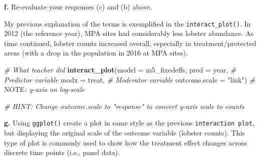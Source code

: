 \documentclass[
]{article}
\newenvironment{Shaded}{\begin{snugshade}}{\end{snugshade}}
\newcommand{\AlertTok}[1]{\textcolor[rgb]{0.94,0.16,0.16}{#1}}
\newcommand{\AttributeTok}[1]{\textcolor[rgb]{0.13,0.29,0.53}{#1}}
\newcommand{\CommentTok}[1]{\textcolor[rgb]{0.56,0.35,0.01}{\textit{#1}}}
\newcommand{\FunctionTok}[1]{\textcolor[rgb]{0.13,0.29,0.53}{\textbf{#1}}}
\newcommand{\NormalTok}[1]{#1}
\newcommand{\StringTok}[1]{\textcolor[rgb]{0.31,0.60,0.02}{#1}}
\begin{document}
\textbf{f.} Re-evaluate your responses (c) and (b) above.

My previous explanation of the terms is exemplified in the
\texttt{interact\_plot()}. In 2012 (the reference year), MPA sites had
considerably less lobster abundance. As time continued, lobster counts
increased overall, especially in treatment/protected areas (with a drop
in the population in 2016 at MPA sites).

\begin{Shaded}
\begin{Highlighting}[]
\CommentTok{\# What teacher did }
\FunctionTok{interact\_plot}\NormalTok{(}\AttributeTok{model =}\NormalTok{ m5\_fixedeffs, }
              \AttributeTok{pred =}\NormalTok{ year, }\CommentTok{\# Predictor variable}
              \AttributeTok{modx =}\NormalTok{ treat, }\CommentTok{\# Moderator variable}
              \AttributeTok{outcome.scale =} \StringTok{"link"}\NormalTok{) }\CommentTok{\# }\AlertTok{NOTE}\CommentTok{: y{-}axis on log{-}scale}

\CommentTok{\# HINT: Change \textasciigrave{}outcome.scale\textasciigrave{} to "response" to convert y{-}axis scale to counts}
\end{Highlighting}
\end{Shaded}

\textbf{g.} Using \texttt{ggplot()} create a plot in same style as the
previous \texttt{interaction\ plot}, but displaying the original scale
of the outcome variable (lobster counts). This type of plot is commonly
used to show how the treatment effect changes across discrete time
points (i.e., panel data).
\end{document}
